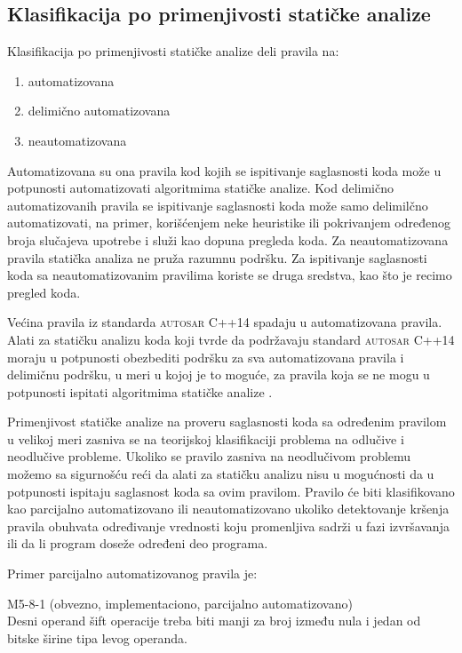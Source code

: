 \documentclass[12pt,oneside]{memoir}
\begin{document}
\subsection{Klasifikacija po primenjivosti statičke analize}
Klasifikacija po primenjivosti statičke analize deli pravila na: 
\begin{enumerate}
  \item{automatizovana}
  \item{delimično automatizovana}
  \item{neautomatizovana}
\end{enumerate}
Automatizovana su ona pravila kod kojih se ispitivanje saglasnosti koda može u potpunosti automatizovati algoritmima statičke analize.
Kod delimično automatizovanih pravila se ispitivanje saglasnosti koda može samo delimilčno automatizovati, na primer, korišćenjem neke heuristike ili pokrivanjem određenog broja slučajeva upotrebe i služi kao dopuna pregleda koda.
Za neautomatizovana pravila statička analiza ne pruža razumnu podršku. Za ispitivanje saglasnosti koda sa neautomatizovanim pravilima koriste se druga sredstva, kao što je recimo pregled koda.

\indent
Većina pravila iz standarda \textsc{autosar} C++14 spadaju u automatizovana pravila. Alati za statičku analizu koda koji tvrde da podržavaju standard \textsc{autosar} C++14 moraju u potpunosti obezbediti podršku za sva automatizovana pravila i delimičnu podršku, u meri u kojoj je to moguće, za pravila koja se ne mogu u potpunosti ispitati algoritmima statičke analize \cite{AutosarGuidelines}.

\indent
Primenjivost statičke analize na proveru saglasnosti koda sa određenim pravilom u velikoj meri zasniva se na teorijskoj klasifikaciji problema
na odlučive i neodlučive probleme. Ukoliko se pravilo zasniva na neodlučivom problemu možemo sa sigurnošću reći da alati za statičku analizu nisu u mogućnosti da u potpunosti ispitaju saglasnost koda sa ovim pravilom. Pravilo će biti klasifikovano kao parcijalno automatizovano ili neautomatizovano ukoliko detektovanje kršenja pravila obuhvata određivanje vrednosti koju promenljiva sadrži u fazi izvr\v{s}avanja ili da li program doseže određeni deo programa.

Primer parcijalno automatizovanog pravila je: 

\begin{center}

\begin{tcolorbox}
 M5-8-1 (obvezno, implementaciono, parcijalno automatizovano) \\
Desni operand šift operacije treba biti manji za broj između nula i jedan
od bitske širine tipa levog operanda.

\end{tcolorbox}
\end{center}
\end{document}
